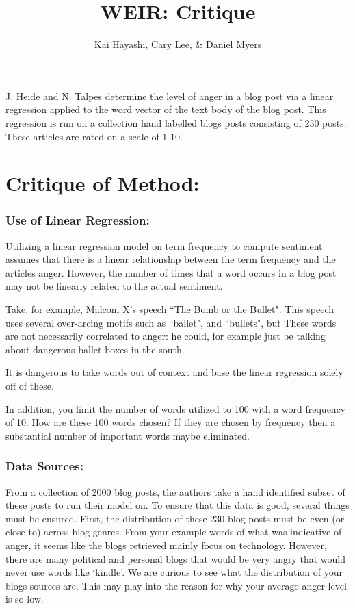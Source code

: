 \documentclass[12pt]{article}
\title{WEIR: Critique}
\author{Kai Hayashi, Cary Lee, \& Daniel Myers}
\date{}                                           %
\begin{document}
\maketitle
J. Heide and N. Talpes determine the level of anger in a blog post via a linear regression applied to the word vector of the text body of the blog post. This regression is run on a collection hand labelled blogs posts consisting of 230 posts. These articles are rated on a scale of 1-10. 
\section*{Critique of Method:}
\subsubsection*{Use of Linear Regression:}
Utilizing a linear regression model on term frequency to compute sentiment assumes that there is a linear relationship between the term frequency and the articles anger. However, the number of times that a word occurs in a blog post may not be linearly related to the actual sentiment. 

Take, for example, Malcom X's speech ``The Bomb or the Bullet". This speech uses several over-arcing motifs such as ``ballet", and ``bullets", but These words are not necessarily correlated to anger: he could, for example just be talking about dangerous ballet boxes in the south. 

It is dangerous to take words out of context and base the linear regression solely off of these. 

In addition, you limit the number of words utilized to 100 with a word frequency of 10. How are these 100 words chosen? If they are chosen by frequency then a substantial number of important words maybe eliminated. 

\subsubsection*{Data Sources:}
From a collection of 2000 blog posts, the authors take a hand identified subset of these posts to run their model on. To ensure that this data is good, several things must be ensured. First, the distribution of these 230 blog posts must be even (or close to) across blog genres. From your example words of what was indicative of anger, it seems like the blogs retrieved mainly focus on technology. However, there are many political and personal blogs that would be very angry that would never use words like `kindle'. We are curious to see what the distribution of your blogs sources are. This may play into the reason for why your average anger level is so low. 
\end{document}
